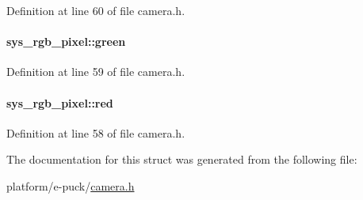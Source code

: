 Definition at line 60 of file camera.\+h.

\hypertarget{structsys__rgb__pixel_a7186eba1f72a58f28ff7a04caaffb8f6}{}
\paragraph[{green}]{ sys\+\_\+rgb\+\_\+pixel\+::green}\label{structsys__rgb__pixel_a7186eba1f72a58f28ff7a04caaffb8f6}


Definition at line 59 of file camera.\+h.

\hypertarget{structsys__rgb__pixel_a5238b3616428441f13d6afbaa3f9d538}{}
\paragraph[{red}]{ sys\+\_\+rgb\+\_\+pixel\+::red}\label{structsys__rgb__pixel_a5238b3616428441f13d6afbaa3f9d538}


Definition at line 58 of file camera.\+h.



The documentation for this struct was generated from the following file\+:\begin{DoxyCompactItemize}
\item 
platform/e-\/puck/\hyperlink{camera_8h}{camera.\+h}\end{DoxyCompactItemize}
